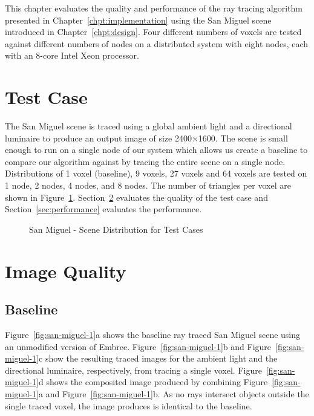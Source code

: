 \label{chpt:evaluation}
This chapter evaluates the quality and performance of the ray tracing algorithm
presented in Chapter~\ref{chpt:implementation} using the San Miguel scene
introduced in Chapter~\ref{chpt:design}.  Four different numbers of voxels are
tested against different numbers of nodes on a distributed system with eight
nodes, each with an 8-core Intel Xeon processor.

\section{Test Case}
The San Miguel scene is traced using a global ambient light and a directional
luminaire to produce an output image of size 2400$\times$1600.  The scene is
small enough to run on a single node of our system which allows us create a baseline
to compare our algorithm against by tracing the entire scene on a single node.
Distributions of 1 voxel (baseline), 9 voxels, 27 voxels and 64 voxels are
tested on 1 node, 2 nodes, 4 nodes, and 8 nodes.  The number of triangles per
voxel are shown in Figure~\ref{fig:voxel-distributions}.
Section~\ref{sec:quality} evaluates the quality of the test case and
Section~\ref{sec:performance} evaluates the performance.

\begin{figure}[!htb]
\noindent{}
\caption{San Miguel - Scene Distribution for Test Cases}
\label{fig:voxel-distributions}
\end{figure}

\section{Image Quality}
\label{sec:quality}
\subsection{Baseline}
Figure~\ref{fig:san-miguel-1}a shows the baseline ray traced San Miguel scene
using an unmodified version of Embree.  Figure~\ref{fig:san-miguel-1}b and
Figure~\ref{fig:san-miguel-1}c show the resulting traced images for the ambient
light and the directional luminaire, respectively, from tracing a single voxel.
Figure~\ref{fig:san-miguel-1}d shows the composited image produced by combining
Figure~\ref{fig:san-miguel-1}a and Figure~\ref{fig:san-miguel-1}b.  As no rays
intersect objects outside the single traced voxel, the image produces is
identical to the baseline.

